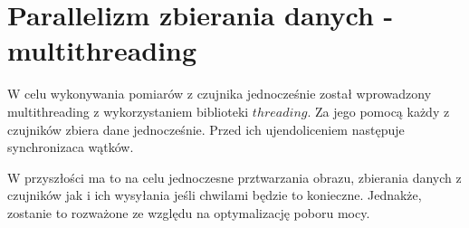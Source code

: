 \documentclass[runningheads]{llncs}
\begin{document}
\section{Parallelizm zbierania danych - multithreading}
W celu wykonywania pomiarów z czujnika jednocześnie został wprowadzony multithreading z wykorzystaniem biblioteki $threading$. Za jego pomocą każdy z czujników zbiera dane jednocześnie. Przed ich ujendoliceniem następuje synchronizaca wątków.

W przyszłości ma to na celu jednoczesne prztwarzania obrazu, zbierania danych z czujników jak i ich wysyłania jeśli chwilami będzie to konieczne. Jednakże, zostanie to rozważone ze względu na optymalizację poboru mocy.
\end{document}
